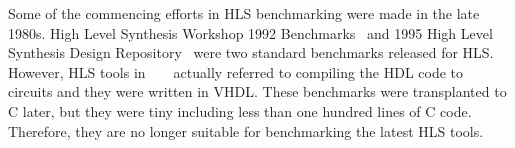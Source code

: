 \documentclass[conference]{IEEEtran}
\begin{document}





Some of the commencing efforts in HLS benchmarking were made in the late 1980s. High Level Synthesis Workshop 1992 Benchmarks~\cite{dutt1992benchmarks} and 1995 High Level Synthesis Design Repository~\cite{panda19951995} were two standard benchmarks released for HLS. However, HLS tools in ~\cite{dutt1992benchmarks} ~\cite{panda19951995} actually referred to compiling the HDL code to circuits and they were written in VHDL. These benchmarks were transplanted to C later, but they were tiny including less than one hundred lines of C code. Therefore, they are no longer suitable for benchmarking the latest HLS tools. 
\end{document}
